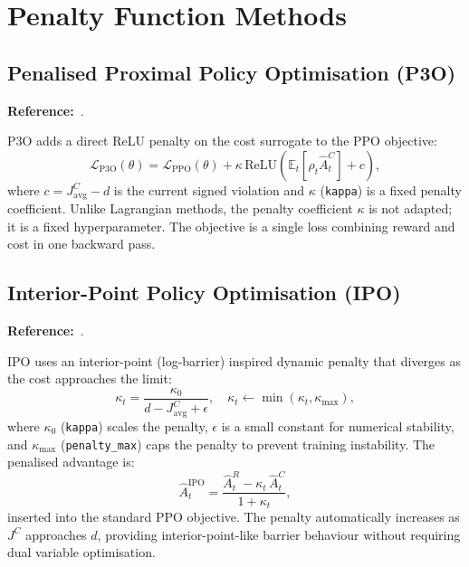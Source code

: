 \documentclass[12pt,a4paper]{article}
\theoremstyle{definition}
\newcommand{\E}{\mathbb{E}}
\begin{document}
\section{Penalty Function Methods}
\label{sec:penalty}

\subsection{Penalised Proximal Policy Optimisation (P3O)}
\label{sec:p3o}

\textbf{Reference:}~\citet{liu2022penalized}.

P3O adds a direct ReLU penalty on the cost surrogate to the PPO objective:
\begin{equation}
  \mathcal{L}_{\mathrm{P3O}}(\theta) = \mathcal{L}_{\mathrm{PPO}}(\theta)
  + \kappa\,\mathrm{ReLU}\!\left(\E_t\!\left[\rho_t\hat{A}_t^C\right] + c\right),
\end{equation}
where $c = J^C_{\mathrm{avg}} - d$ is the current signed violation and $\kappa$
(\texttt{kappa}) is a fixed penalty coefficient. Unlike Lagrangian methods, the penalty
coefficient $\kappa$ is not adapted; it is a fixed hyperparameter. The objective is a
single loss combining reward and cost in one backward pass.

\subsection{Interior-Point Policy Optimisation (IPO)}
\label{sec:ipo}

\textbf{Reference:}~\citet{liu2020ipo}.

IPO uses an interior-point (log-barrier) inspired dynamic penalty that diverges as the cost
approaches the limit:
\begin{equation}
  \label{eq:ipo_penalty}
  \kappa_t = \frac{\kappa_0}{d - J^C_{\mathrm{avg}} + \epsilon},
  \quad \kappa_t \leftarrow \min(\kappa_t, \kappa_{\max}),
\end{equation}
where $\kappa_0$ (\texttt{kappa}) scales the penalty, $\epsilon$ is a small constant for
numerical stability, and $\kappa_{\max}$ (\texttt{penalty\_max}) caps the penalty to prevent
training instability. The penalised advantage is:
\begin{equation}
  \hat{A}_t^{\mathrm{IPO}} = \frac{\hat{A}_t^R - \kappa_t\,\hat{A}_t^C}{1+\kappa_t},
\end{equation}
inserted into the standard PPO objective. The penalty automatically increases as $J^C$
approaches $d$, providing interior-point-like barrier behaviour without requiring dual
variable optimisation.
\end{document}
